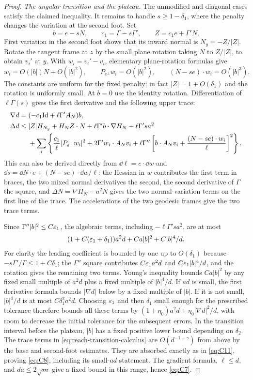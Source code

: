 \begin{proof}
\emph{The angular transition and the plateau.}
The unmodified and diagonal cases satisfy the claimed inequality.
It remains to handle $s\ge1-\delta_1$, where the penalty changes
the variation at the second foot.  Set
\[
 b=e-sN,\qquad c_1=\Gamma-s\Gamma',\qquad
 Z=c_1e+\Gamma'N.
\]
First variation in the second foot shows that its inward normal is
$N_y=-Z/|Z|$.  Rotate the tangent frame at $z$ by the small plane
rotation taking $N$ to $Z/|Z|$, to obtain $v_i'$ at $y$.
With $w_i=v_i'-v_i$, elementary plane-rotation formulas give
\[
 w_i=O(|b|)N+O(|b|^2),\qquad
 P_{e^\perp}w_i=O(|b|^2),\qquad
 (N-se)\cdot w_i=O(|b|^3).
\]
The constants are uniform for the fixed penalty; in fact
$|Z|=1+O(\delta_1)$ and the rotation is uniformly small.  At $b=0$
use the identity rotation.  Differentiation of $\ell\Gamma(s)$
gives the first derivative and the following upper trace:
\begin{equation}\label{eq:reach-transition-calculus}
 \begin{split}
 \nabla d={}&(-c_1\mathrm{Id}+\ell\Gamma'A_N)b,\\
 \Delta d\le{}&|Z|H_{N_y}+H_N Z\cdot N
 +\ell\Gamma' b\cdot\nabla H_N-\ell\Gamma's a^2\\
 &+\sum_i\left\{
 \frac{c_1}{\ell}|P_{e^\perp}w_i|^2
 +2\Gamma' w_i\cdot A_Nv_i
 +\ell\Gamma''\left[b\cdot A_Nv_i
       +\frac{(N-se)\cdot w_i}{\ell}\right]^2\right\}.
 \end{split}
\end{equation}
This can also be derived directly from
$\dd\ell=e\cdot\dd w$ and
$\dd s=\dd N\cdot e+(N-se)\cdot\dd w/\ell$:
the Hessian in $w$ contributes the first term in braces,
the two mixed normal derivatives the second, the second derivative
of $\Gamma$ the square, and
$\Delta N=\nabla H_N-a^2N$ gives the two normal-variation terms
on the first line of the trace.  The accelerations of the two
geodesic frames give the two trace terms.

Since $\Gamma''|b|^2\le C\varepsilon_1$, the algebraic terms, including
$-\ell\Gamma'sa^2$, are at most
\[
 (1+C(\varepsilon_1+\delta_1))a^2d
       +Ca|b|^2+C|b|^4/d.
\]
For clarity the leading coefficient is bounded by one up to
$O(\delta_1)$ because $-s\Gamma'/\Gamma\le1+C\delta_1$;
the $\Gamma''$ square contributes $C\varepsilon_1a^2d$ and
$C\varepsilon_1|b|^4/d$, and the rotation gives the remaining two terms.
Young's inequality bounds $Ca|b|^2$ by any fixed small multiple
of $a^2d$ plus a fixed multiple of $|b|^4/d$.
If $ad$ is small, the first derivative formula bounds
$|\nabla d|$ below by a fixed multiple of $|b|$.
If it is not small, $|b|^4/d$ is at most
$C\delta_1^2a^2d$.  Choosing $\varepsilon_1$ and then $\delta_1$ small
enough for the prescribed tolerance therefore bounds all these
terms by $(1+\eta_0)a^2d+\eta_0|\nabla d|^2/d$, with room to
decrease the initial tolerance for the subsequent errors.
In the transition interval before the plateau, $|b|$ has a fixed
positive lower bound depending on $\delta_2$.  The trace terms in
\eqref{eq:reach-transition-calculus} are
$O(d^{-1-\gamma})$ from above by the base and second-foot estimates.
They are absorbed exactly as in \eqref{eq:C11}, proving
\eqref{eq:C8}, including its small-$ad$ statement.  The gradient
formula, $\ell\le d$, and $da\le2\sqrt m$ give a fixed bound in
this range, hence \eqref{eq:C7}.


\end{proof}
